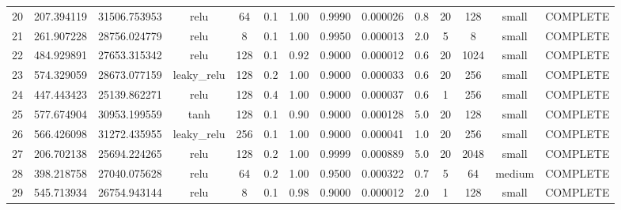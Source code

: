 \begin{longtable}{cccccccccccccc}
                       20 &                 207.394119 &                       31506.753953 &            relu &          64 &         0.1 &        1.00 & 0.9990 &       0.000026 &             0.8 &        20 &      128 &     small & COMPLETE \\
                       21 &                 261.907228 &                       28756.024779 &            relu &           8 &         0.1 &        1.00 & 0.9950 &       0.000013 &             2.0 &         5 &        8 &     small & COMPLETE \\
                       22 &                 484.929891 &                       27653.315342 &            relu &         128 &         0.1 &        0.92 & 0.9000 &       0.000012 &             0.6 &        20 &     1024 &     small & COMPLETE \\
                       23 &                 574.329059 &                       28673.077159 &     leaky\_relu &         128 &         0.2 &        1.00 & 0.9000 &       0.000033 &             0.6 &        20 &      256 &     small & COMPLETE \\
                       24 &                 447.443423 &                       25139.862271 &            relu &         128 &         0.4 &        1.00 & 0.9000 &       0.000037 &             0.6 &         1 &      256 &     small & COMPLETE \\
                       25 &                 577.674904 &                       30953.199559 &            tanh &         128 &         0.1 &        0.90 & 0.9000 &       0.000128 &             5.0 &        20 &      128 &     small & COMPLETE \\
                       26 &                 566.426098 &                       31272.435955 &     leaky\_relu &         256 &         0.1 &        1.00 & 0.9000 &       0.000041 &             1.0 &        20 &      256 &     small & COMPLETE \\
                       27 &                 206.702138 &                       25694.224265 &            relu &         128 &         0.2 &        1.00 & 0.9999 &       0.000889 &             5.0 &        20 &     2048 &     small & COMPLETE \\
                       28 &                 398.218758 &                       27040.075628 &            relu &          64 &         0.2 &        1.00 & 0.9500 &       0.000322 &             0.7 &         5 &       64 &    medium & COMPLETE \\
                       29 &                 545.713934 &                       26754.943144 &            relu &           8 &         0.1 &        0.98 & 0.9000 &       0.000012 &             2.0 &         1 &      128 &     small & COMPLETE \\

\end{longtable}

